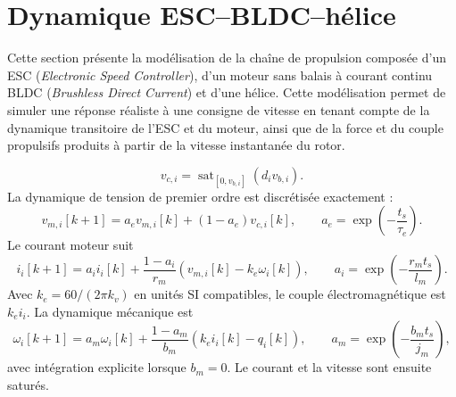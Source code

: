 \documentclass[11pt,a4paper,oneside]{report}
\newcommand{\sat}{\operatorname{sat}}
\newcommand{\english}[1]{\textit{#1}}
\begin{document}
	
	
	\section{Dynamique ESC--BLDC--hélice}
	Cette section présente la modélisation de la chaîne de propulsion composée d'un ESC (\english{Electronic Speed Controller}), d'un moteur sans balais à courant continu BLDC (\english{Brushless Direct Current}) et d'une hélice. Cette modélisation permet de simuler une réponse réaliste à une consigne de vitesse en tenant compte de la dynamique transitoire de l'ESC et du moteur, ainsi que de la force et du couple propulsifs produits à partir de la vitesse instantanée du rotor.
	
	\begin{equation}
		v_{c,i}=\sat_{[0,v_{b,i}]}(d_iv_{b,i}).
		\label{eq_voltage_command}
	\end{equation}
	La dynamique de tension de premier ordre est discrétisée exactement :
	\begin{equation}
		v_{m,i}[k+1]=a_ev_{m,i}[k]+(1-a_e)v_{c,i}[k],
		\qquad
		a_e=\exp\left(-\frac{t_s}{\tau_e}\right).
		\label{eq_esc_discrete}
	\end{equation}
	Le courant moteur suit
	\begin{equation}
		i_i[k+1]=a_ii_i[k]+\frac{1-a_i}{r_m}\left(v_{m,i}[k]-k_e\omega_i[k]\right),
		\qquad
		a_i=\exp\left(-\frac{r_mt_s}{l_m}\right).
		\label{eq_current_discrete}
	\end{equation}
	Avec $k_e=60/(2\pi k_v)$ en unités SI compatibles, le couple électromagnétique est $k_ei_i$. La dynamique mécanique est
	\begin{equation}
		\omega_i[k+1]=a_m\omega_i[k]+\frac{1-a_m}{b_m}\left(k_ei_i[k]-q_i[k]\right),
		\qquad
		a_m=\exp\left(-\frac{b_mt_s}{j_m}\right),
		\label{eq_motor_speed_discrete}
	\end{equation}
	avec intégration explicite lorsque $b_m=0$. Le courant et la vitesse sont ensuite saturés.
	
\end{document}
